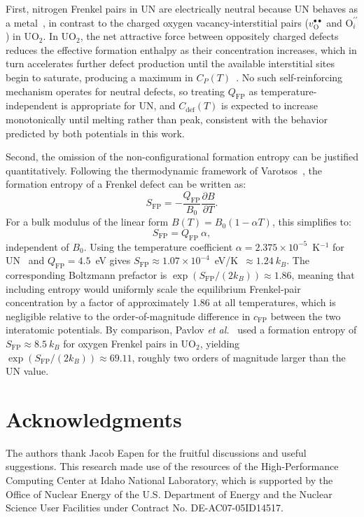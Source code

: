 \documentclass[preprint,12pt,sort&compress]{elsarticle}
\newcommand{\?}{\stackrel{?}{=}}
\begin{document}
First, nitrogen Frenkel pairs in UN are electrically neutral because UN behaves as a metal~\cite{AbdulHameed2024b}, in contrast to the charged oxygen vacancy-interstitial pairs ($v_\text{O}^{\bullet\bullet}$ and $\text{O}_i^{\prime\prime}$) in UO$_2$. In UO$_2$, the net attractive force between oppositely charged defects reduces the effective formation enthalpy as their concentration increases, which in turn accelerates further defect production until the available interstitial sites begin to saturate, producing a maximum in $C_P(T)$~\cite{Pavlov2017,Cooper2014}. No such self-reinforcing mechanism operates for neutral defects, so treating $Q_\text{FP}$ as temperature-independent is appropriate for UN, and $C_\text{def}(T)$ is expected to increase monotonically until melting rather than peak, consistent with the behavior predicted by both potentials in this work.

Second, the omission of the non-configurational formation entropy can be justified quantitatively. Following the thermodynamic framework of Varotsos~\cite{Varotsos1976}, the formation entropy of a Frenkel defect can be written as:
\begin{equation}
S_\text{FP} = -\frac{Q_\text{FP}}{B_0}\frac{\partial B}{\partial T}.
\label{Eq:S_F}
\end{equation}
For a bulk modulus of the linear form $B(T) = B_0(1 - \alpha T)$, this simplifies to:
\begin{equation}
S_\text{FP} = Q_\text{FP} \ \alpha,
\end{equation}
independent of $B_0$. Using the temperature coefficient $\alpha = 2.375\times10^{-5}$~K$^{-1}$ for UN~\cite{Hayes1990II} and $Q_\text{FP} = 4.5$~eV gives $S_\text{FP} \approx 1.07\times10^{-4}$~eV/K~$\approx 1.24 \ k_B$. The corresponding Boltzmann prefactor is $\exp(S_\text{FP}/(2k_B)) \approx 1.86$, meaning that including entropy would uniformly scale the equilibrium Frenkel-pair concentration by a factor of approximately 1.86 at all temperatures, which is negligible relative to the order-of-magnitude difference in $c_\text{FP}$ between the two interatomic potentials. By comparison, Pavlov \textit{et al.}~\cite{Pavlov2017} used a formation entropy of $S_\text{FP} \approx 8.5 \ k_B$ for oxygen Frenkel pairs in UO$_2$, yielding $\exp(S_\text{FP}/(2k_B)) \approx 69.11$, roughly two orders of magnitude larger than the UN value.

\section*{Acknowledgments}

The authors thank Jacob Eapen for the fruitful discussions and useful suggestions. This research made use of the resources of the High-Performance Computing Center at Idaho National Laboratory, which is supported by the Office of Nuclear Energy of the U.S. Department of Energy and the Nuclear Science User Facilities under Contract No. DE-AC07-05ID14517.



\end{document}
